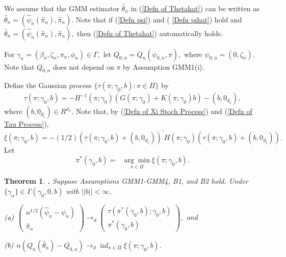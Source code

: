 \documentclass[12pt,titlepage,final,oneside,letterpaper]{article}
\newtheorem{theorem}{Theorem}[section]
\begin{document}
We assume that the GMM estimator $\widehat{\theta }_{n}$ in (\ref{Defn of
Thetahat}) can be written as $\widehat{\theta }_{n}=(\widehat{\psi }_{n}(%
\widehat{\pi }_{n}),\widehat{\pi }_{n}).$ Note that if (\ref{Defn psi}) and (%
\ref{Defn pihat}) hold and $\widehat{\theta }_{n}=(\widehat{\psi }_{n}(%
\widehat{\pi }_{n}),\widehat{\pi }_{n}),$ then (\ref{Defn of Thetahat})
automatically holds.

For $\gamma _{n}=(\beta _{n},\zeta _{n},\pi _{n},\phi _{n})\in \Gamma ,$ let 
$Q_{0,n}=Q_{n}(\psi _{0,n},\pi ),$ where $\psi _{0,n}=(0,\zeta _{n}).$ Note
that $Q_{0,n}$ does not depend on $\pi $ by Assumption GMM1(i).

Define the Gaussian process $\{\tau (\pi ;\gamma _{0},b):\pi \in \Pi \}$ by%
\begin{equation}
\tau (\pi ;\gamma _{0},b)=-H^{-1}(\pi ;\gamma _{0})(G(\pi ;\gamma
_{0})+K(\pi ;\gamma _{0})b)-(b,0_{d_{\zeta }}),  \label{Defn of Tau Process}
\end{equation}%
where $(b,0_{d_{\zeta }})\in R^{d_{\psi }}.$ Note that, by (\ref{Defn of Xi
Stoch Process}) and (\ref{Defn of Tau Process}), $\xi (\pi ;\gamma
_{0},b)=-(1/2)(\tau (\pi ;\gamma _{0},b)+(b,0_{d_{\zeta }}))^{\prime }H(\pi
;\gamma _{0})(\tau (\pi ;\gamma _{0},b)+(b,0_{d_{\zeta }})).$ Let%
\begin{equation}
\pi ^{\ast }(\gamma _{0},b)=\text{ }\underset{\pi \in \Pi }{\arg \min }\text{
}\xi (\pi ;\gamma _{0},b).  \label{PiStar Process}
\end{equation}

\begin{theorem}
\hspace{-0.08in}\textbf{. }\label{Thm dist'n of estimator b=finite}Suppose
Assumptions \emph{GMM1-GMM4,} \emph{B1, }and \emph{B2} hold. Under $\{\gamma
_{n}\}\in \Gamma (\gamma _{0},0,b)$ with $||b||<\infty ,$

\noindent $\emph{(a)}$ $\left( 
\begin{array}{c}
n^{1/2}(\widehat{\psi }_{n}-\psi _{n}) \\ 
\widehat{\pi }_{n}%
\end{array}%
\right) \overset{}{\rightarrow _{d}}\left( 
\begin{array}{c}
\tau (\pi ^{\ast }(\gamma _{0},b);\gamma _{0},b) \\ 
\pi ^{\ast }(\gamma _{0},b)%
\end{array}%
\right) ,$ and

\noindent $\emph{(b)}$ $n\left( Q_{n}(\widehat{\theta }_{n})-Q_{0,n}\right) 
\overset{}{\rightarrow _{d}}\inf_{\pi \in \Pi }\xi (\pi ;\gamma _{0},b).$
\end{theorem}
\end{document}
